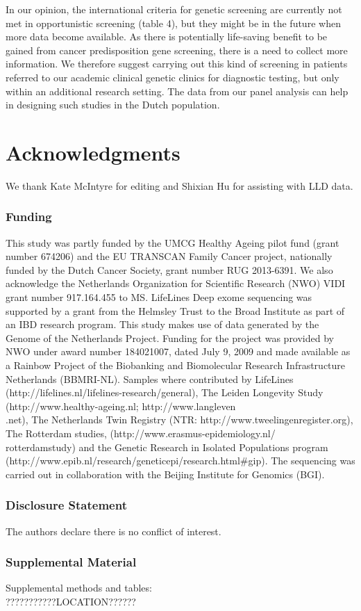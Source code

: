 In our opinion, the international criteria for genetic screening are currently not met in opportunistic screening (table 4), but they might be in the future when more data become available.  %
As there is potentially life-saving benefit to be gained from cancer predisposition gene screening, there is a need to collect more information. 
We therefore suggest carrying out this kind of screening in patients referred to our academic clinical genetic clinics for diagnostic testing, but only within an additional research setting. 
The data from our panel analysis can help in designing such studies in the Dutch population.




\section{Acknowledgments}\label{Acknowledgments} 
We thank Kate McIntyre for editing and Shixian Hu for assisting with LLD data.

\subsubsection{Funding}
This study was partly funded by the UMCG Healthy Ageing pilot fund (grant number 674206) and the EU TRANSCAN Family Cancer project, nationally funded by the Dutch Cancer Society, grant number RUG 2013-6391. We also acknowledge the Netherlands Organization for Scientific Research (NWO) VIDI grant number 917.164.455 to MS. LifeLines Deep exome sequencing was supported by a grant from the Helmsley Trust to the Broad Institute as part of an IBD research program. This study makes use of data generated by the Genome of the Netherlands Project. Funding for the project was provided by NWO under award number 184021007, dated July 9, 2009 and made available as a Rainbow Project of the Biobanking and Biomolecular Research Infrastructure Netherlands (BBMRI-NL). Samples where contributed by LifeLines (http://lifelines.nl/lifelines-research/general), The Leiden Longevity Study (http://www.healthy-ageing.nl; http://www.langleven\\.net), The Netherlands Twin Registry (NTR: http://www.tweelingenregister.org), The Rotterdam studies, (http://www.erasmus-epidemiology.nl/\\rotterdamstudy) and the Genetic Research in Isolated Populations program (http://www.epib.nl/research/geneticepi/research.html\#gip). The sequencing was carried out in collaboration with the Beijing Institute for Genomics (BGI).

\subsubsection{Disclosure Statement} 
The authors declare there is no conflict of interest.

\subsubsection{Supplemental Material}
Supplemental methods and tables: \\ ???????????LOCATION?????? \\
